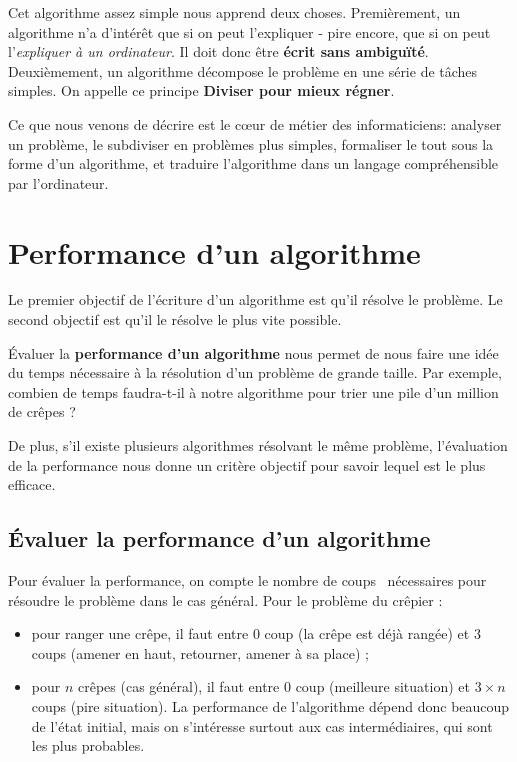 \documentclass[a5paper,pagesize,DIV=14]{scrbook}
\begin{document}
Cet algorithme assez simple nous apprend deux choses. Premièrement, un
algorithme n'a d'intérêt que si on peut l'expliquer - pire encore, que si on
peut l'\textit{expliquer à un ordinateur}. Il doit donc être \textbf{écrit sans
  ambiguïté}. Deuxièmement, un algorithme décompose le problème en une série de
tâches simples. On appelle ce principe \textbf{\og Diviser pour mieux
  régner\fg}.

Ce que nous venons de décrire est le c\oe{}ur de métier des informaticiens:
analyser un problème, le subdiviser en problèmes plus simples, formaliser le
tout sous la forme d'un algorithme, et traduire l'algorithme dans un langage
compréhensible par l'ordinateur.

\section*{Performance d'un algorithme}

Le premier objectif de l'écriture d'un algorithme est qu'il résolve le
problème. Le second objectif est qu'il le résolve le plus vite possible.

Évaluer la \textbf{performance d'un algorithme} nous permet de nous faire une
idée du temps nécessaire à la résolution d'un problème de grande taille. Par
exemple, combien de temps faudra-t-il à notre algorithme pour trier une pile
d'un million de crêpes ?

De plus, s'il existe plusieurs algorithmes résolvant le même problème,
l'évaluation de la performance nous donne un critère objectif pour savoir lequel
est le plus efficace.

\subsection*{Évaluer la performance d'un algorithme}

Pour évaluer la performance, on compte le nombre de \og coups \fg\ nécessaires
pour résoudre le problème dans le cas général. Pour le problème du crêpier :

\begin{itemize}
\item pour ranger une crêpe, il faut entre $0$ coup (la crêpe est déjà rangée)
  et $3$ coups (amener en haut, retourner, amener à sa place) ;
\item pour $n$ crêpes (cas général), il faut entre $0$ coup (meilleure
  situation) et $3 \times n$ coups (pire situation). La performance de
  l'algorithme dépend donc beaucoup de l'état initial, mais on s'intéresse
  surtout aux cas intermédiaires, qui sont les plus probables.
\end{itemize}
\end{document}
